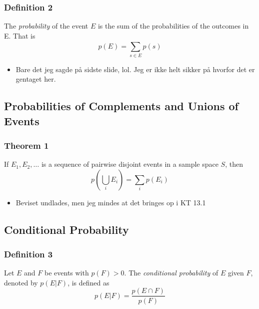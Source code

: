 \documentclass{beamer}
\begin{document}
\begin{frame}
  \frametitle{Definition 2}
  \begin{definition}
The \textit{probability}  of the event $E$ is the sum of the probabilities of the outcomes in E. That is $$p(E) = \sum_{s \in E}^{}p(s)$$

\end{definition}
\begin{itemize}
\item Bare det jeg sagde på sidste slide, lol. Jeg er ikke helt sikker på hvorfor det er gentaget her.
\end{itemize}
\end{frame}

\subsection{Probabilities of Complements and Unions of Events}
\label{subsec:label}

\begin{frame}
  \frametitle{Theorem 1}
 \begin{theorem}

If $E_{1}, E_{2}, \ldots$ is a sequence of pairwise disjoint events in a sample space $S$, then $$p \left ( \bigcup_{i} E_{i} \right ) = \sum_{i}^{} p(E_{i})$$
\end{theorem}
\begin{itemize}
\item Beviset undlades, men jeg mindes at det bringes op i KT 13.1
\end{itemize}
\end{frame}

\subsection{Conditional Probability}
\label{subsec:condprob}

\begin{frame}
  \frametitle{Definition 3}
  \begin{definition}
Let $E$ and $F$ be events with $p(F) > 0$. The \textit{conditional probability} of $E$ given $F$, denoted by $p(E |F)$, is defined as $$p(E|F) = \frac{p(E \cap F)}{p(F)}$$
  \end{definition}
\end{frame}
\end{document}
